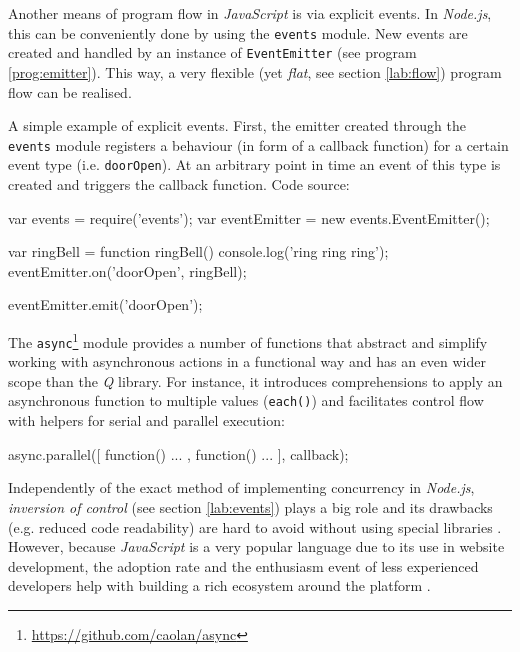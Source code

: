 Another means of program flow in \textit{JavaScript} is via explicit events. In \textit{Node.js}, this can be conveniently done by using the \texttt{events} module. New events are created and handled by an instance of \texttt{EventEmitter} (see program \ref{prog:emitter}). This way, a very flexible (yet \textit{flat}, see section \ref{lab:flow}) program flow can be realised.

\begin{program}
  \caption{A simple example of explicit events. First, the emitter created through the \texttt{events} module registers a behaviour (in form of a callback function) for a certain event type (i.e. \texttt{doorOpen}). At an arbitrary point in time an event of this type is created and triggers the callback function. Code source: \cite{Cogneau2013}}
  \label{prog:emitter}
  \begin{JavaCode}
var events = require('events');
var eventEmitter = new events.EventEmitter();
 
var ringBell = function ringBell()
{
    console.log('ring ring ring');
}
eventEmitter.on('doorOpen', ringBell);
 
eventEmitter.emit('doorOpen');
  \end{JavaCode}
\end{program}

The \texttt{async}\footnote{\url{https://github.com/caolan/async}} module provides a number of functions that abstract and simplify working with asynchronous actions in a functional way and has an even wider scope than the \textit{Q} library. For instance, it introduces comprehensions to apply an asynchronous function to multiple values (\texttt{each()}) and facilitates control flow with helpers for serial and parallel execution:

\begin{JavaCode}
async.parallel([
    function(){ ... },
    function(){ ... }
], callback);
\end{JavaCode}

Independently of the exact method of implementing concurrency in \textit{Node.js}, \textit{inversion of control} (see section \ref{lab:events}) plays a big role and its drawbacks (e.g. reduced code readability) are hard to avoid without using special libraries \cite[p. 93]{Erb2012}. However, because \textit{JavaScript} is a very popular language due to its use in website development, the adoption rate and the enthusiasm event of less experienced developers help with building a rich ecosystem around the platform \cite[p. 27]{Hughes-Croucher2012}.

